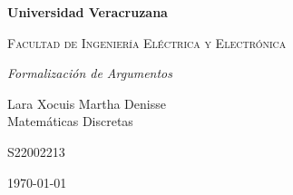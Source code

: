 \documentclass[letterpaper,12pt]{article}
\begin{document}
\begin{sloppypar} 
\begin{titlepage}
    \hspace{2.5cm}
    {\bfseries\LARGE Universidad Veracruzana \par}
    \hspace{2cm}
    {\scshape\Large Facultad de Ingeniería Eléctrica y Electrónica \par}
    \begin{center}
        \vspace{7cm}
        {\itshape\huge Formalización de Argumentos \par}
        {\large Lara Xocuis Martha Denisse \\ Matemáticas Discretas \par}
        {\large S22002213 \par}
        \vfill
        {\Large \today \par}
    \end{center}
\end{titlepage} 


\end{sloppypar}
\end{document}
